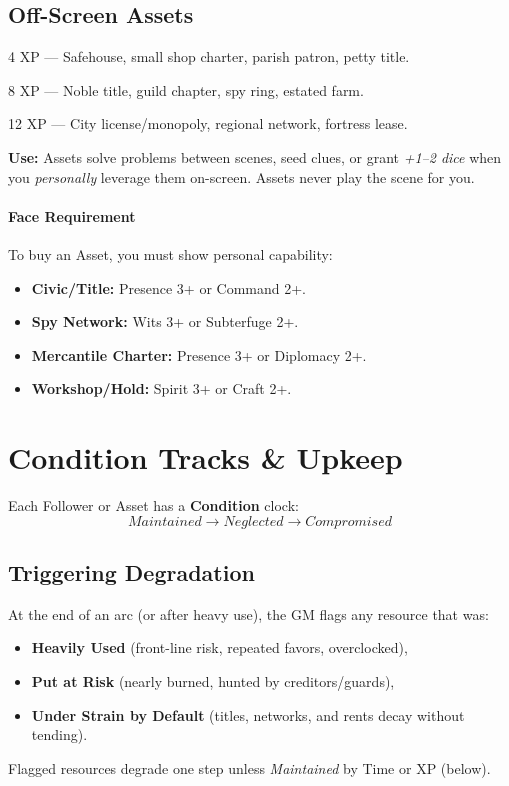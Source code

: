 \documentclass[12pt]{book}
\begin{document}
\subsection{Off-Screen Assets}
\begin{description}[leftmargin=3.2cm]
  \item[Minor] 4 XP — Safehouse, small shop charter, parish patron, petty title.
  \item[Standard] 8 XP — Noble title, guild chapter, spy ring, estated farm.
  \item[Major] 12 XP — City license/monopoly, regional network, fortress lease.
\end{description}
\textbf{Use:} Assets solve problems between scenes, seed clues, or grant \emph{+1--2 dice} when you \emph{personally} leverage them on-screen. Assets never play the scene for you.

\paragraph{Face Requirement}
To buy an Asset, you must show personal capability:
\begin{itemize}
  \item \textbf{Civic/Title:} Presence 3+ or Command 2+.
  \item \textbf{Spy Network:} Wits 3+ or Subterfuge 2+.
  \item \textbf{Mercantile Charter:} Presence 3+ or Diplomacy 2+.
  \item \textbf{Workshop/Hold:} Spirit 3+ or Craft 2+.
\end{itemize}

\section{Condition Tracks \& Upkeep}
\label{upkeep}
Each Follower or Asset has a \textbf{Condition} clock:
\[
\textit{Maintained} \rightarrow \textit{Neglected} \rightarrow \textit{Compromised}
\]

\subsection{Triggering Degradation}
At the end of an arc (or after heavy use), the GM flags any resource that was:
\begin{itemize}
  \item \textbf{Heavily Used} (front-line risk, repeated favors, overclocked),
  \item \textbf{Put at Risk} (nearly burned, hunted by creditors/guards),
  \item \textbf{Under Strain by Default} (titles, networks, and rents decay without tending).
\end{itemize}
Flagged resources degrade one step unless \emph{Maintained} by Time or XP (below).
\end{document}
